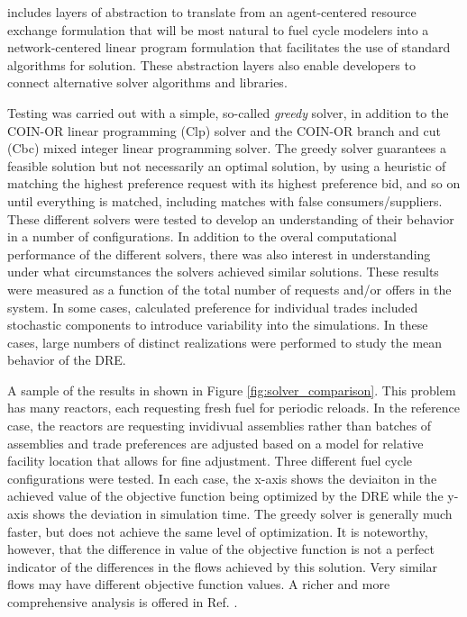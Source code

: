 \Cyclus{} includes layers of abstraction to translate from an agent-centered
resource exchange formulation that will be most natural to fuel cycle modelers
into a network-centered linear program formulation that facilitates the use of
standard algorithms for solution.  These abstraction layers also enable
developers to connect alternative solver algorithms and libraries.

Testing was carried out with a simple, so-called \textit{greedy} solver, in
addition to the \gls{COIN-OR} linear programming (Clp) solver and the
\gls{COIN-OR} branch and cut (Cbc) mixed integer linear programming solver.
The greedy solver guarantees a feasible solution but not necessarily an
optimal solution, by using a heuristic of matching the highest preference
request with its highest preference bid, and so on until everything is
matched, including matches with false consumers/suppliers.  These different
solvers were tested to develop an understanding of their behavior in a number
of configurations. In addition to the overal computational
performance of the different solvers, there was also interest in understanding
under what circumstances the solvers achieved similar solutions.  These
results were measured as a function of the total number of requests and/or
offers in the system.  In some cases, calculated preference for individual
trades included stochastic components to introduce variability into the
simulations.  In these cases, large numbers of distinct realizations were
performed to study the mean behavior of the \gls{DRE}.

A sample of the results in shown in Figure \ref{fig:solver_comparison}.  This
problem has many reactors, each requesting fresh fuel for periodic reloads.
In the reference case, the reactors are requesting invidivual assemblies
rather than batches of assemblies and trade preferences are adjusted based on
a model for relative facility location that allows for fine adjustment.  Three
different fuel cycle configurations were tested. In each case, the x-axis
shows the deviaiton in the achieved value of the objective function being
optimized by the \gls{DRE} while the y-axis shows the deviation in simulation
time.  The greedy solver is generally much faster, but does not achieve the
same level of optimization.  It is noteworthy, however, that the difference in
value of the objective function is not a perfect indicator of the differences
in the flows achieved by this solution.  Very similar flows may have different
objective function values.  A richer and more comprehensive analysis is
offered in Ref. .

